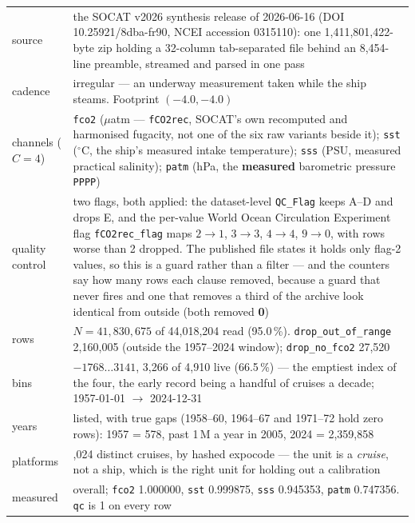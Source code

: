 \documentclass[10pt]{article}
\newcommand{\code}[1]{\texttt{#1}}
\begin{document}
\begin{table}[h]
\centering\setlength{\tabcolsep}{5pt}\footnotesize
\begin{tabular}{@{}>{\raggedright\arraybackslash}p{2.8cm}>{\raggedright\arraybackslash}p{12.5cm}@{}}
\toprule
source & the SOCAT v2026 synthesis release of 2026-06-16 (DOI 10.25921/8dba-fr90, NCEI accession 0315110): one 1,411,801,422-byte zip holding a 32-column tab-separated file behind an 8,454-line preamble, streamed and parsed in one pass \\
cadence & irregular --- an underway measurement taken while the ship steams. Footprint $(-4.0, -4.0)$ \\
channels ($C = 4$) & \code{fco2} ($\mu$atm --- \code{fCO2rec}, SOCAT's own recomputed and harmonised fugacity, not one of the six raw variants beside it); \code{sst} ($^\circ$C, the ship's measured intake temperature); \code{sss} (PSU, measured practical salinity); \code{patm} (hPa, the \textbf{measured} barometric pressure \code{PPPP}) \\
quality control & two flags, both applied: the dataset-level \code{QC\_Flag} keeps A--D and drops E, and the per-value World Ocean Circulation Experiment flag \code{fCO2rec\_flag} maps $2 \to 1$, $3 \to 3$, $4 \to 4$, $9 \to 0$, with rows worse than 2 dropped. The published file states it holds only flag-2 values, so this is a guard rather than a filter --- and the counters say how many rows each clause removed, because a guard that never fires and one that removes a third of the archive look identical from outside (both removed \textbf{0}) \\
rows & $N = 41{,}830{,}675$ of 44,018,204 read (95.0\,\%). \code{drop\_out\_of\_range} 2,160,005 (outside the 1957--2024 window); \code{drop\_no\_fco2} 27,520 \\
bins & $-1768 \ldots 3141$, 3,266 of 4,910 live (66.5\,\%) --- the emptiest index of the four, the early record being a handful of cruises a decade; 1957-01-01 $\to$ 2024-12-31 \\
years & 68 listed, with true gaps (1958--60, 1964--67 and 1971--72 hold zero rows): 1957 = 578, past 1\,M a year in 2005, 2024 = 2,359,858 \\
platforms & 8,024 distinct cruises, by hashed expocode --- the unit is a \emph{cruise}, not a ship, which is the right unit for holding out a calibration \\
measured & 0.923146 overall; \code{fco2} 1.000000, \code{sst} 0.999875, \code{sss} 0.945353, \code{patm} 0.747356. \code{qc} is 1 on every row \\

\end{tabular}
\end{table}
\end{document}
